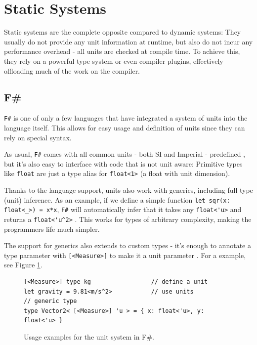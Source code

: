 \documentclass[12pt,oneside,a4paper]{scrbook}
\begin{document}
\section{Static Systems}

Static systems are the complete opposite compared to dynamic systems: They usually do not provide any unit information at runtime, but also do not incur any performance overhead - all units are checked at compile time. To achieve this, they rely on a powerful type system or even compiler plugins, effectively offloading much of the work on the compiler.

\subsection{F\#}

\verb/F#/ is one of only a few languages that have integrated a system of units into the language itself. This allows for easy usage and definition of units since they can rely on special syntax.
\citep{Kennedy08:1}

As usual, \verb/F#/ comes with all common units - both SI and Imperial - predefined \citep{Kennedy08:2}, but it's also easy to interface with code that is not unit aware: Primitive types like \verb/float/ are just a type alias for \verb/float<1>/ (a float with unit dimension).

Thanks to the language support, units also work with generics, including full type (unit) inference. As an example, if we define a simple function \verb/let sqr(x: float<_>) = x*x/, \verb/F#/ will automatically infer that it takes any \verb/float<'u>/ and returns a \verb/float<'u^2>/ \citep{Kennedy08:3}. This works for types of arbitrary complexity, making the programmers life much simpler.

The support for generics also extends to custom types - it's enough to annotate a type parameter with \verb/[<Measure>]/ to make it a unit parameter \citep{Kennedy08:4}. For a example, see Figure \ref{code:fsharp}.


\begin{figure}
\begin{verbatim}
[<Measure>] type kg                 // define a unit
let gravity = 9.81<m/s^2>           // use units
// generic type
type Vector2< [<Measure>] 'u > = { x: float<'u>, y: float<'u> }
\end{verbatim}
\caption{Usage examples for the unit system in F\#.}
\label{code:fsharp}
\end{figure}
\end{document}
